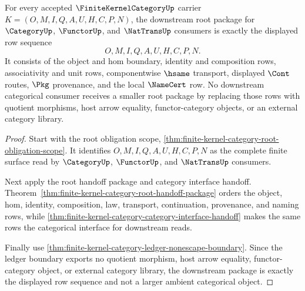 \begin{theorem}
\label{thm:finite-kernel-category-downstream-root-package}
For every accepted $\FiniteKernelCategoryUp$ carrier $K=(O,M,I,Q,A,U,H,C,P,N)$, the downstream root package for $\CategoryUp$, $\FunctorUp$, and $\NatTransUp$ consumers is exactly the displayed row sequence
$$
O,M,I,Q,A,U,H,C,P,N.
$$
It consists of the object and hom boundary, identity and composition rows, associativity and unit rows, componentwise $\hsame$ transport, displayed $\Cont$ routes, $\Pkg$ provenance, and the local $\NameCert$ row. No downstream categorical consumer receives a smaller root package by replacing those rows with quotient morphisms, host arrow equality, functor-category objects, or an external category library.
\end{theorem}
\begin{proof}
Start with the root obligation scope, \autoref{thm:finite-kernel-category-root-obligation-scope}. It identifies $O,M,I,Q,A,U,H,C,P,N$ as the complete finite surface read by $\CategoryUp$, $\FunctorUp$, and $\NatTransUp$ consumers.

Next apply the root handoff package and category interface handoff. Theorem~\ref{thm:finite-kernel-category-root-handoff-package} orders the object, hom, identity, composition, law, transport, continuation, provenance, and naming rows, while \autoref{thm:finite-kernel-category-category-interface-handoff} makes the same rows the categorical interface for downstream reads.

Finally use \autoref{thm:finite-kernel-category-ledger-nonescape-boundary}. Since the ledger boundary exports no quotient morphism, host arrow equality, functor-category object, or external category library, the downstream package is exactly the displayed row sequence and not a larger ambient categorical object.
\end{proof}

